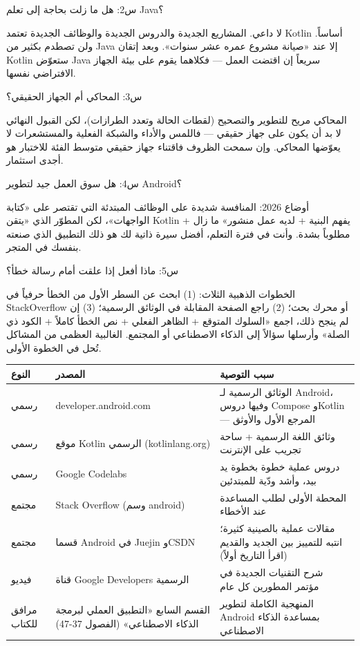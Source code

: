س2: هل ما زلت بحاجة إلى تعلم Java؟

لا داعي. المشاريع الجديدة والدروس الجديدة والوظائف الجديدة تعتمد Kotlin أساساً. ولن تصطدم بكثير من Java إلا عند «صيانة مشروع عمره عشر سنوات». وبعد إتقان Kotlin ستعوّض Java سريعاً إن اقتضت العمل — فكلاهما يقوم على بيئة الجهاز الافتراضي نفسها.

س3: المحاكي أم الجهاز الحقيقي؟

المحاكي مريح للتطوير والتصحيح (لقطات الحالة وتعدد الطرازات)، لكن القبول النهائي لا بد أن يكون على جهاز حقيقي — فاللمس والأداء والشبكة الفعلية والمستشعرات لا يعوّضها المحاكي. وإن سمحت الظروف فاقتناء جهاز حقيقي متوسط الفئة للاختبار هو أجدى استثمار.

س4: هل سوق العمل جيد لتطوير Android؟

أوضاع 2026: المنافسة شديدة على الوظائف المبتدئة التي تقتصر على «كتابة الواجهات»، لكن المطوّر الذي «يتقن Kotlin + يفهم البنية + لديه عمل منشور» ما زال مطلوباً بشدة. وأنت في فترة التعلم، أفضل سيرة ذاتية لك هو ذلك التطبيق الذي صنعته بنفسك في المتجر.

س5: ماذا أفعل إذا علقت أمام رسالة خطأ؟

الخطوات الذهبية الثلاث: (1) ابحث عن السطر الأول من الخطأ حرفياً في StackOverflow أو محرك بحث؛ (2) راجع الصفحة المقابلة في الوثائق الرسمية؛ (3) إن لم ينجح ذلك، اجمع «السلوك المتوقع + الظاهر الفعلي + نص الخطأ كاملاً + الكود ذي الصلة» وأرسلها سؤالاً إلى الذكاء الاصطناعي أو المجتمع. الغالبية العظمى من المشاكل تُحل في الخطوة الأولى.


\begin{center}
\begin{tabularx}{\linewidth}{|X|X|X|}
\hline
\textbf{النوع} & \textbf{المصدر} & \textbf{سبب التوصية} \tabularnewline
\hline
رسمي & developer.android.com & الوثائق الرسمية لـ Android، وفيها دروس Compose وKotlin — المرجع الأول والأوثق \tabularnewline
رسمي & موقع Kotlin الرسمي (kotlinlang.org) & وثائق اللغة الرسمية + ساحة تجريب على الإنترنت \tabularnewline
رسمي & Google Codelabs & دروس عملية خطوة بخطوة يد بيد، وأشد ودّية للمبتدئين \tabularnewline
مجتمع & Stack Overflow (وسم android) & المحطة الأولى لطلب المساعدة عند الأخطاء \tabularnewline
مجتمع & قسما Android في Juejin وCSDN & مقالات عملية بالصينية كثيرة؛ انتبه للتمييز بين الجديد والقديم (اقرأ التاريخ أولاً) \tabularnewline
فيديو & قناة Google Developers الرسمية & شرح التقنيات الجديدة في مؤتمر المطورين كل عام \tabularnewline
مرافق للكتاب & القسم السابع «التطبيق العملي لبرمجة الذكاء الاصطناعي» (الفصول 37-47) & المنهجية الكاملة لتطوير Android بمساعدة الذكاء الاصطناعي \tabularnewline
\hline
\end{tabularx}
\end{center}

